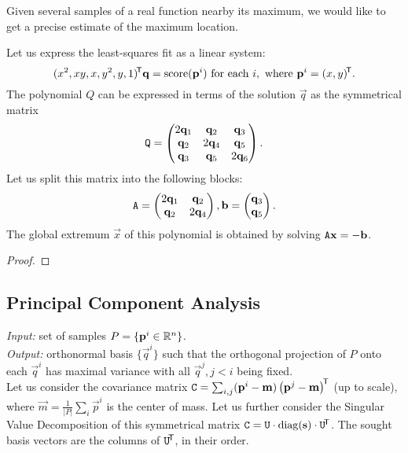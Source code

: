 Given several samples of a real function nearby its maximum, we would like to get a precise estimate of the maximum location.

Let us express the least-squares fit as a linear system:
$$(x^2, xy, x, y^2, y, 1)^{\!\mathsf{T}} \mathbf{q} = \textrm{score}(\mathbf{p}^i) \text{ for each } i, \text{ where } \mathbf{p}^i = (x, y)^{\!\mathsf{T}}.$$
The polynomial $Q$ can be expressed in terms of the solution $\vec q$ as the symmetrical matrix
$$\mathtt{Q} = \begin{pmatrix}
 2 \mathbf{q}_1 & \mathbf{q}_2 & \mathbf{q}_3 \\
 \mathbf{q}_2 & 2 \mathbf{q}_4 & \mathbf{q}_5 \\
 \mathbf{q}_3 & \mathbf{q}_5 & 2 \mathbf{q}_6
\end{pmatrix}.$$
Let us split this matrix into the following blocks:
\begin{equation}
\mathtt{A} = \begin{pmatrix}
 2 \mathbf{q}_1 & \mathbf{q}_2 \\
 \mathbf{q}_2 & 2 \mathbf{q}_4 \\
\end{pmatrix},
\mathbf{b} = \begin{pmatrix}
 \mathbf{q}_3 \\
 \mathbf{q}_5 \\
\end{pmatrix}.
\end{equation}
The global extremum $\vec x$ of this polynomial is obtained by solving $\mathtt{A} \mathbf{x} = -\mathbf{b}$.

\begin{proof}
\todo{\dots}
\end{proof}

\subsection{Principal Component Analysis}
\textit{Input:} set of samples $P = \{\mathbf{p}^i \in \mathbb{R}^n \}$.\\
\textit{Output:} orthonormal basis $\{\vec q^i\}$ such that the orthogonal projection of $P$ onto each $\vec q^i$ has maximal variance with all $\vec q^j, j < i$ being fixed.\\

Let us consider the covariance matrix $\mathtt{C} = \sum_{i,j} (\mathbf{p}^i - \mathbf{m}) \left(\mathbf{p}^j - \mathbf{m} \right) ^{\!\mathsf{T}}$ (up to scale), where $\vec m = \frac 1 {|P|} \sum_i \vec p^i$ is the center of mass. Let us further consider the Singular Value Decomposition of this symmetrical matrix $\mathtt{C} = \mathtt{U} \cdot \mathrm{diag}(\mathbf{s}) \cdot \mathtt{U}^{\!\mathsf{T}}$.
The sought basis vectors are the columns of $\mathtt{U}^{\!\mathsf{T}}$, in their order.


